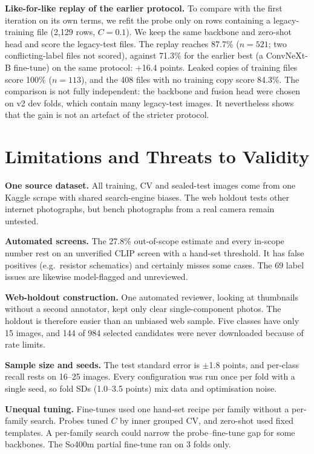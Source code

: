 \documentclass[conference]{IEEEtran}
\begin{document}
\textbf{Like-for-like replay of the earlier protocol.} To compare with the first iteration on its own terms, we refit
the probe only on rows containing a legacy-training file (2,129 rows, $C=0.1$). We keep the same backbone and
zero-shot head and score the legacy-test files. The replay reaches 87.7\% ($n=521$; two conflicting-label files not
scored), against 71.3\% for the earlier best (a ConvNeXt-B fine-tune) on the same protocol: +16.4 points. Leaked copies
of training files score 100\% ($n=113$), and the 408 files with no training copy score 84.3\%. The comparison is not
fully independent: the backbone and fusion head were chosen on v2 dev folds, which contain many legacy-test images.
It nevertheless shows that the gain is not an artefact of the stricter protocol.

\section{Limitations and Threats to Validity}\label{sec:limits}
\textbf{One source dataset.} All training, CV and sealed-test images come from one Kaggle scrape with shared
search-engine biases. The web holdout tests other internet photographs, but bench photographs from a real camera
remain untested.

\textbf{Automated screens.} The 27.8\% out-of-scope estimate and every in-scope number rest on an unverified CLIP screen
with a hand-set threshold. It has false positives (e.g.\ resistor schematics) and certainly misses some cases. The 69
label issues are likewise model-flagged and unreviewed.

\textbf{Web-holdout construction.} One automated reviewer, looking at thumbnails without a second annotator, kept only
clear single-component photos. The holdout is therefore easier than an unbiased web sample. Five classes have only 15
images, and 144 of 984 selected candidates were never downloaded because of rate limits.

\textbf{Sample size and seeds.} The test standard error is $\pm$1.8 points, and per-class recall rests on 16--25
images. Every configuration was run once per fold with a single seed, so fold SDs (1.0--3.5 points) mix data and
optimisation noise.

\textbf{Unequal tuning.} Fine-tunes used one hand-set recipe per family without a per-family search. Probes tuned $C$
by inner grouped CV, and zero-shot used fixed templates. A per-family search could narrow the probe--fine-tune gap for
some backbones. The So400m partial fine-tune ran on 3 folds only.
\end{document}
